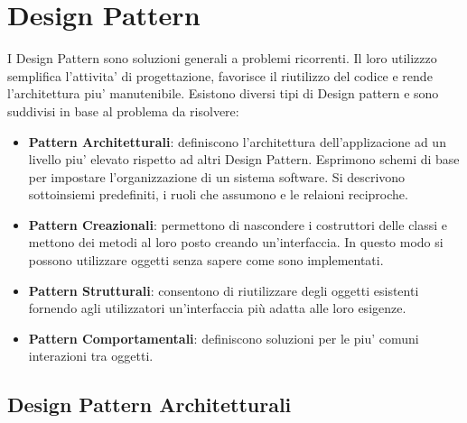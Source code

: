 \section{Design Pattern}
	I Design Pattern sono soluzioni generali a problemi ricorrenti. Il loro utilizzzo semplifica l'attivita' di progettazione, favorisce il riutilizzo del codice e rende l'architettura piu' manutenibile. Esistono diversi tipi di Design pattern e sono suddivisi in base al problema da risolvere:
	\begin{itemize}\itemsep1pt
		\item \textbf{Pattern Architetturali}: definiscono l'architettura dell'applizacione ad un livello piu' elevato rispetto ad altri Design Pattern. Esprimono schemi di base per impostare l'organizzazione di un sistema software. Si descrivono sottoinsiemi predefiniti, i ruoli che assumono e le relaioni reciproche. 
		\item \textbf{Pattern Creazionali}: permettono di nascondere i costruttori delle classi e mettono dei metodi al loro posto creando un'interfaccia. In questo modo si possono utilizzare oggetti senza sapere come sono implementati.
		\item \textbf{Pattern Strutturali}: consentono di riutilizzare degli oggetti esistenti fornendo agli utilizzatori un'interfaccia più adatta alle loro esigenze.
		\item \textbf{Pattern Comportamentali}: definiscono soluzioni per le piu' comuni interazioni tra oggetti.
	\end{itemize} 
	
	\subsection{Design Pattern Architetturali}
